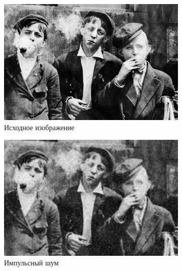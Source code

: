   \begin{figure}[ht!] 
    \centering
    \begin{subfigure}[b]{0.5\linewidth}
        \centering
        \includegraphics[width=0.95\linewidth]{../lewis-hine-taschen-main-3.jpg} 
        \caption{Исходное изображение} 
        \label{gaussian_11:a} 
        \vspace{4ex}
    \end{subfigure}%
    \begin{subfigure}[b]{0.5\linewidth}
      \centering
      \includegraphics[width=0.95\linewidth]{../Gaussian_Blur/Gaussian_Blur_Impulse_noise_(11,11).jpg} 
      \caption{Импульсный шум} 
      \label{gaussian_11:b} 
      \vspace{4ex}
    \end{subfigure}
    \begin{subfigure}[b]{0.5\linewidth}
      \centering

\end{subfigure}
\end{figure}
